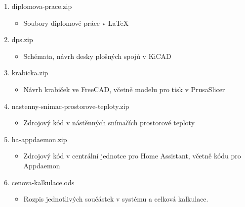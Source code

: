 \begin{enumerate}
  \item diplomova-prace.zip
  \begin{itemize}
     	\item Soubory diplomové práce v \LaTeX
  	\end{itemize}
  \item dps.zip 
  	\begin{itemize}
     	\item Schémata, návrh desky plošných spojů v KiCAD
  	\end{itemize}
  \item krabicka.zip
  	\begin{itemize}
     	\item Návrh krabiček ve FreeCAD, včetně modelu pro tisk v PrusaSlicer 
   	\end{itemize}
   \item nastenny-snimac-prostorove-teploty.zip
  		\begin{itemize}
     		\item Zdrojový kód v nástěnných snímačích prostorové teploty
   		\end{itemize}
   	\item ha-appdaemon.zip
  		\begin{itemize}
     		\item Zdrojový kód v centrální jednotce pro Home Assistant, včetně kódu pro Appdaemon
   		\end{itemize}
   	\item cenova-kalkulace.ods
  		\begin{itemize}
     		\item Rozpis jednotlivých součástek v systému a celková kalkulace.
   		\end{itemize}
\end{enumerate}